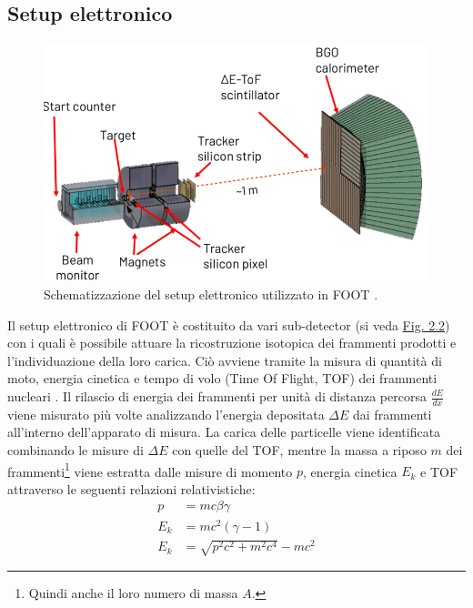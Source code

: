 \documentclass[12pt,a4paper,twoside]{report}
\begin{document}
	\subsection{Setup elettronico}\label{sec:setupElettronico}
	\begin{figure}[H]
		\centering
		\includegraphics[width=0.9\linewidth]{electronic_setup.png}
		\caption{Schematizzazione del setup elettronico utilizzato in FOOT \cite{foot_site2}.}
		\label{fig:electronic_setup}
	\end{figure}
	Il setup elettronico di FOOT è costituito da vari sub-detector (si veda \hyperref[fig:electronic_setup]{Fig. 2.2}) con i quali è possibile attuare la ricostruzione isotopica dei frammenti prodotti e l'individuazione della loro carica. Ciò avviene tramite la misura di quantità di moto, energia cinetica e tempo di volo (Time Of Flight, TOF) dei frammenti nucleari \cite{foot_cdr}. Il rilascio di energia dei frammenti per unità di distanza percorsa $\frac{dE}{dx}$ viene misurato più volte analizzando l'energia depositata $\Delta E$ dai frammenti all'interno dell'apparato di misura. La carica delle particelle viene identificata combinando le misure di $\Delta E$ con quelle del TOF, mentre la massa a riposo $m$ dei frammenti\footnote{Quindi anche il loro numero di massa $A$.} viene estratta dalle misure di momento $p$, energia cinetica $E_k$ e TOF attraverso le seguenti relazioni relativistiche:
	\begin{subequations}
		\begin{align}
			\label{eq:momentum}
			p&=mc\beta\gamma\\
			\label{eq:kinetic_energy1}
			E_k&=mc^2\left(\gamma-1\right)\\
			\label{eq:kinetic_energy2}
			E_k&=\sqrt{p^2c^2+m^2c^4}-mc^2
		\end{align}
	\end{subequations}
\end{document}
